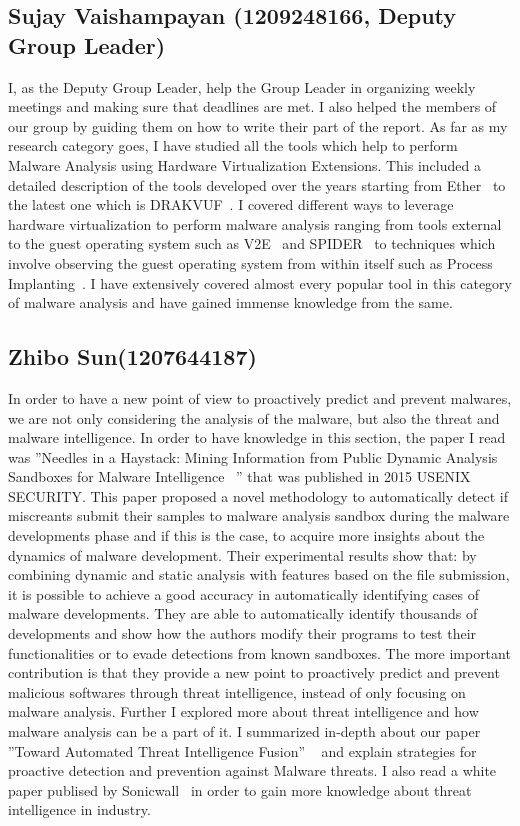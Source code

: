 \documentclass[11pt]{article}
\begin{document}
\subsection{Sujay Vaishampayan (1209248166, Deputy Group Leader)}
I, as the Deputy Group Leader, help the Group Leader in organizing weekly meetings and making sure that deadlines are met. I also helped the members of our group by guiding them on how to write their part of the report. As far as my research category goes, I have studied all the tools which help to perform Malware Analysis using Hardware Virtualization Extensions. This included a detailed description of the tools developed over the years starting from Ether~\cite{dinaburg2008ether} to the latest one which is DRAKVUF~\cite{lengyel2014scalability}. I covered different ways to leverage hardware virtualization to perform malware analysis ranging from tools external to the guest operating system such as V2E~\cite{yan2012v2e} and SPIDER~\cite{dongyan2013spider} to techniques which involve observing the guest operating system from within itself such as Process Implanting~\cite{jiang2011procimplant}. I have extensively covered almost every popular tool in this category of malware analysis and have gained immense knowledge from the same.


\subsection{Zhibo Sun(1207644187)}
	In order to have a new point of view to proactively predict and prevent malwares, we are not only considering the analysis of the malware, but also the threat and malware intelligence. In order to have knowledge in this section, the paper I read was ”Needles in a Haystack: Mining Information from Public Dynamic Analysis Sandboxes for Malware Intelligence~\cite{graziano2015needles} ” that was published in 2015 USENIX SECURITY.
	This paper proposed a novel methodology to automatically detect if miscreants submit their samples to malware analysis sandbox during the malware developments phase and if this is the case, to acquire more insights about the dynamics of malware development. Their experimental results show that: by combining dynamic and static analysis with features based on the file submission, it is possible to achieve a good accuracy in automatically identifying cases of malware developments. They are able to automatically identify thousands of developments and show how the authors modify their programs to test their functionalities or to evade detections from known sandboxes. The more important contribution is that they provide a new point to proactively predict and prevent malicious softwares through threat intelligence, instead of only focusing on malware analysis.
	Further I explored more about threat intelligence and how malware analysis can be a part of it. I summarized in-depth about our paper ”Toward Automated Threat Intelligence Fusion” ~\cite{moditowards} and explain strategies for proactive detection and prevention against Malware threats. I also read a white paper publised by Sonicwall~\cite{whitman2016threats} in order to gain more knowledge about threat intelligence in industry.
	
\end{document}
